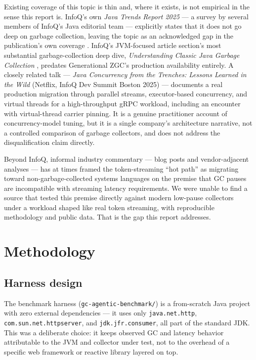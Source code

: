 \documentclass[11pt]{article}
\newcommand{\code}[1]{\texttt{#1}}
\begin{document}
Existing coverage of this topic is thin and, where it exists, is not empirical in the sense this
report is. InfoQ's own \emph{Java Trends Report 2025} --- a survey by several members of InfoQ's
Java editorial team --- explicitly states that it does not go deep on garbage collection, leaving
the topic as an acknowledged gap in the publication's own coverage \cite{infoq-trends-2025}.
InfoQ's JVM-focused article section's most substantial garbage-collection deep dive,
\emph{Understanding Classic Java Garbage Collection} \cite{evans-2020}, predates Generational
ZGC's production availability entirely. A closely related talk --- \emph{Java Concurrency from
the Trenches: Lessons Learned in the Wild} (Netflix, InfoQ Dev Summit Boston 2025)
\cite{marques-2025} --- documents a real production migration through parallel streams,
executor-based concurrency, and virtual threads for a high-throughput gRPC workload, including
an encounter with virtual-thread carrier pinning. It is a genuine practitioner account of
concurrency-model tuning, but it is a single company's architecture narrative, not a controlled
comparison of garbage collectors, and does not address the disqualification claim directly.

Beyond InfoQ, informal industry commentary --- blog posts and vendor-adjacent analyses --- has at
times framed the token-streaming ``hot path'' as migrating toward non-garbage-collected systems
languages on the premise that GC pauses are incompatible with streaming latency requirements. We
were unable to find a source that tested this premise directly against modern low-pause
collectors under a workload shaped like real token streaming, with reproducible methodology and
public data. That is the gap this report addresses.

\section{Methodology}

\subsection{Harness design}

The benchmark harness (\code{gc-agentic-benchmark/}) is a from-scratch Java project with zero
external dependencies --- it uses only \code{java.net.http}, \code{com.sun.net.httpserver}, and
\code{jdk.jfr.consumer}, all part of the standard JDK. This was a deliberate choice: it keeps
observed GC and latency behavior attributable to the JVM and collector under test, not to the
overhead of a specific web framework or reactive library layered on top.
\end{document}
